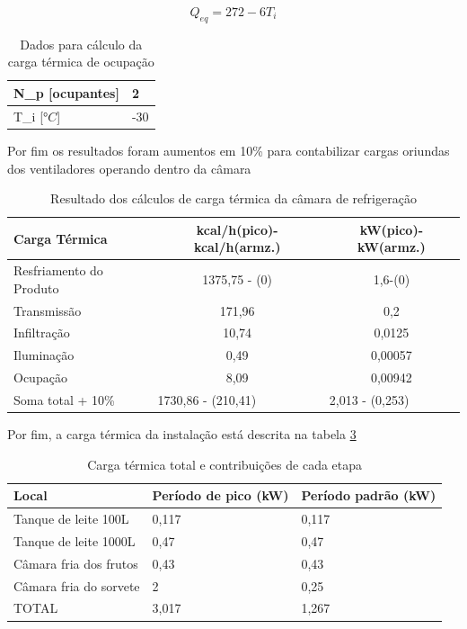 \documentclass[10pt,a4paper]{article}
\begin{document}
\begin{equation}
    Q_{eq} = 272 -6T_{i}
\end{equation}

\begin{table}[h]
\centering
\caption{Dados para cálculo da carga térmica de ocupação}
\begin{tabular}{|l|l|}
\hline
N_{p} [ocupantes] & 2 \\ \hline
T_{i} [$°C$] & -30 \\ \hline
\end{tabular}
\label{dados_ocup}
\end{table}

Por fim os resultados foram aumentos em 10\% para contabilizar cargas oriundas dos ventiladores operando dentro da câmara
\begin{table}[h]
\centering
\caption{Resultado dos cálculos de carga térmica da câmara de refrigeração}
\begin{tabular}{|l|c|c|}
\hline
Carga Térmica & kcal/h(pico)-kcal/h(armz.) & kW(pico)-kW(armz.) \\ \hline
Resfriamento do Produto & 1375,75 - (0) & 1,6-(0) \\ \hline
Transmissão & 171,96 & 0,2 \\ \hline
Infiltração & 10,74 & 0,0125 \\ \hline
Iluminação & 0,49 & 0,00057 \\ \hline
Ocupação & 8,09 & 0,00942 \\ \hline
Soma total + 10\% & \multicolumn{1}{l|}{1730,86 - (210,41)} & \multicolumn{1}{l|}{2,013 - (0,253)} \\ \hline
\end{tabular}
\label{Tabela resultados 3.1.3}
\end{table}

Por fim, a carga térmica da instalação está descrita na tabela \ref{total_carga_Term}

\begin{table}[h]
\centering
\caption{Carga térmica total e contribuições de cada etapa}
\begin{tabular}{|l|l|l|}
\hline
Local & Período de pico (kW) & Período padrão (kW) \\ \hline
Tanque de leite 100L & 0,117 & 0,117 \\ \hline
Tanque de leite 1000L & 0,47 & 0,47 \\ \hline
Câmara fria dos frutos & 0,43 & 0,43 \\ \hline
Câmara fria do sorvete & 2 & 0,25 \\ \hline
TOTAL & 3,017 & 1,267 \\ \hline
\end{tabular}
\label{total_carga_Term}
\end{table}
\end{document}

